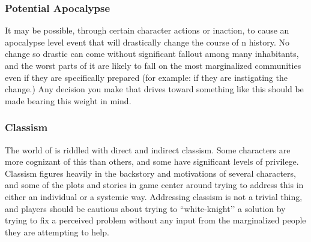 \documentclass[sheet]{GL2020}
\begin{document}
\subsubsection{Potential Apocalypse}
It may be possible, through certain character actions or inaction, to cause an apocalypse level event that will drastically change the course of \pEarth{}n history. No change so drastic can come without significant fallout among many inhabitants, and the worst parts of it are likely to fall on the most marginalized communities even if they are specifically prepared (for example: if they are instigating the change.) Any decision you make that drives toward something like this should be made bearing this weight in mind.

\subsubsection{Classism}
The world of \pEarth{} is riddled with direct and indirect classism. Some characters are more cognizant of this than others, and some have significant levels of privilege. Classism figures heavily in the backstory and motivations of several characters, and some of the plots and stories in game center around trying to address this in either an individual or a systemic way. Addressing classism is not a trivial thing, and players should be cautious about trying to ``white-knight’’ a solution by trying to fix a perceived problem without any input from the marginalized people they are attempting to help.
\end{document}
